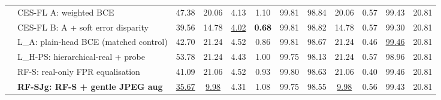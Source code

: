 \documentclass[11pt]{article}
\begin{document}
\begin{table}[h]
{\begin{tabular}{ll ccccc ccc c c}
 & CES-FL A: weighted BCE & 47.38 & 20.06 & 4.13 & 1.10 & 99.81 & 98.84 & 20.06 & 0.57 & 99.43 & 20.81 \\
 & CES-FL B: A + soft error disparity & 39.56 & 14.78 & \underline{4.02} & \textbf{0.68} & 99.81 & 98.82 & 14.78 & 0.57 & 99.30 & 20.81 \\
 & L\_A: plain-head BCE (matched control) & 42.70 & 21.24 & 4.52 & 0.86 & 99.81 & 98.67 & 21.24 & 0.46 & \underline{99.46} & 20.81 \\
 & L\_H-PS: hierarchical-real + probe & 53.78 & 21.24 & 4.43 & 1.00 & 99.75 & 98.13 & 21.24 & 0.57 & 98.96 & 20.81 \\
 & RF-S: real-only FPR equalisation & 41.09 & 21.06 & 4.52 & 0.93 & 99.80 & 98.63 & 21.06 & 0.40 & 99.46 & 20.81 \\
 & \textbf{RF-SJg: RF-S + gentle JPEG aug} & \underline{35.67} & \underline{9.98} & 4.31 & 1.08 & 99.75 & 98.55 & \underline{9.98} & 0.56 & 99.43 & 20.81 \\
\bottomrule
\end{tabular}}
\end{table}
\end{document}
